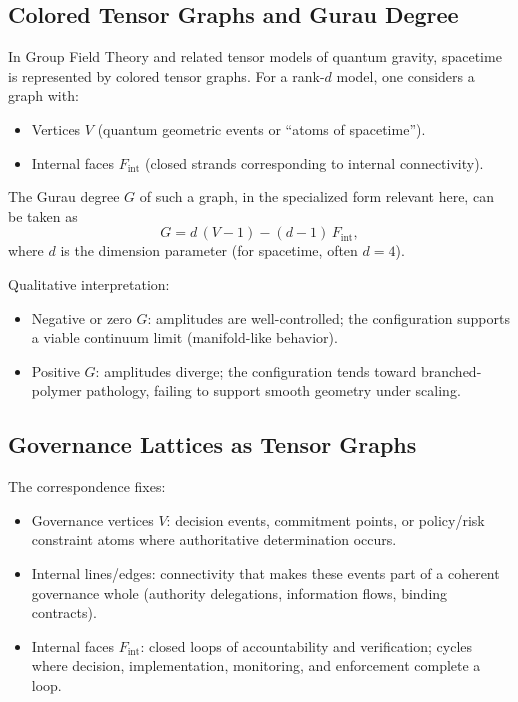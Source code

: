 \documentclass[11pt]{article}
\begin{document}
\subsection{Colored Tensor Graphs and Gurau Degree}

In Group Field Theory and related tensor models of quantum gravity, spacetime is represented by colored tensor graphs. For a rank-\(d\) model, one considers a graph with:
\begin{itemize}
  \item Vertices \(V\) (quantum geometric events or ``atoms of spacetime'').
  \item Internal faces \(F_{\text{int}}\) (closed strands corresponding to internal connectivity).
\end{itemize}

The Gurau degree \(G\) of such a graph, in the specialized form relevant here, can be taken as
\[
G = d\,(V - 1) - (d - 1)\,F_{\text{int}},
\]
where \(d\) is the dimension parameter (for spacetime, often \(d = 4\)).

Qualitative interpretation:
\begin{itemize}
  \item Negative or zero \(G\): amplitudes are well-controlled; the configuration supports a viable continuum limit (manifold-like behavior).
  \item Positive \(G\): amplitudes diverge; the configuration tends toward branched-polymer pathology, failing to support smooth geometry under scaling.
\end{itemize}

\subsection{Governance Lattices as Tensor Graphs}

The correspondence fixes:
\begin{itemize}
  \item Governance vertices \(V\): decision events, commitment points, or policy/risk constraint atoms where authoritative determination occurs.
  \item Internal lines/edges: connectivity that makes these events part of a coherent governance whole (authority delegations, information flows, binding contracts).
  \item Internal faces \(F_{\text{int}}\): closed loops of accountability and verification; cycles where decision, implementation, monitoring, and enforcement complete a loop.
\end{itemize}
\end{document}
